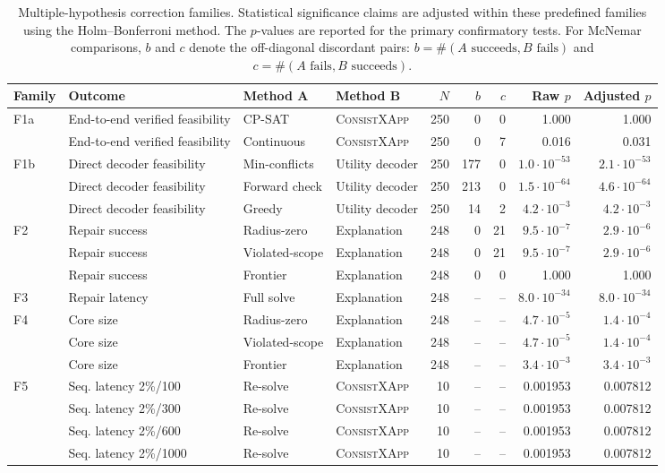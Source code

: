 \documentclass[pdflatex,sn-mathphys-num,iicol,oneside]{sn-jnl}
\newcommand{\method}{\textsc{ConsistXApp}\xspace}
\newcommand{\cpsat}{\textsc{CP-SAT}\xspace}
\begin{document}
\begin{table}[t]
\centering
\caption{Multiple-hypothesis correction families. Statistical significance claims are adjusted within these predefined families using the Holm--Bonferroni method. The $p$-values are reported for the primary confirmatory tests. For McNemar comparisons, $b$ and $c$ denote the off-diagonal discordant pairs: $b=\#(A\text{ succeeds},B\text{ fails})$ and $c=\#(A\text{ fails},B\text{ succeeds})$.}
\label{tab:families}
\setlength{\tabcolsep}{3.5pt}
\small
\begin{tabular}{llllrrrrr}
\toprule
Family & Outcome & Method A & Method B & $N$ & $b$ & $c$ & Raw $p$ & Adjusted $p$ \\
\midrule
F1a & End-to-end verified feasibility & \cpsat & \method & 250 & 0 & 0 & 1.000 & 1.000 \\
    & End-to-end verified feasibility & Continuous & \method & 250 & 0 & 7 & 0.016 & 0.031 \\
\midrule
F1b & Direct decoder feasibility & Min-conflicts & Utility decoder & 250 & 177 & 0 & $1.0\cdot 10^{-53}$ & $2.1\cdot 10^{-53}$ \\
    & Direct decoder feasibility & Forward check & Utility decoder & 250 & 213 & 0 & $1.5\cdot 10^{-64}$ & $4.6\cdot 10^{-64}$ \\
    & Direct decoder feasibility & Greedy & Utility decoder & 250 & 14 & 2 & $4.2\cdot 10^{-3}$ & $4.2\cdot 10^{-3}$ \\
\midrule
F2 & Repair success & Radius-zero & Explanation & 248 & 0 & 21 & $9.5\cdot 10^{-7}$ & $2.9\cdot 10^{-6}$ \\
   & Repair success & Violated-scope & Explanation & 248 & 0 & 21 & $9.5\cdot 10^{-7}$ & $2.9\cdot 10^{-6}$ \\
   & Repair success & Frontier & Explanation & 248 & 0 & 0 & 1.000 & 1.000 \\
\midrule
F3 & Repair latency & Full solve & Explanation & 248 & -- & -- & $8.0\cdot 10^{-34}$ & $8.0\cdot 10^{-34}$ \\
\midrule
F4 & Core size & Radius-zero & Explanation & 248 & -- & -- & $4.7\cdot 10^{-5}$ & $1.4\cdot 10^{-4}$ \\
   & Core size & Violated-scope & Explanation & 248 & -- & -- & $4.7\cdot 10^{-5}$ & $1.4\cdot 10^{-4}$ \\
   & Core size & Frontier & Explanation & 248 & -- & -- & $3.4\cdot 10^{-3}$ & $3.4\cdot 10^{-3}$ \\
\midrule
F5 & Seq. latency 2\%/100 & Re-solve & \method & 10 & -- & -- & 0.001953 & 0.007812 \\
   & Seq. latency 2\%/300 & Re-solve & \method & 10 & -- & -- & 0.001953 & 0.007812 \\
   & Seq. latency 2\%/600 & Re-solve & \method & 10 & -- & -- & 0.001953 & 0.007812 \\
   & Seq. latency 2\%/1000 & Re-solve & \method & 10 & -- & -- & 0.001953 & 0.007812 \\
\bottomrule
\end{tabular}
\end{table}
\end{document}
